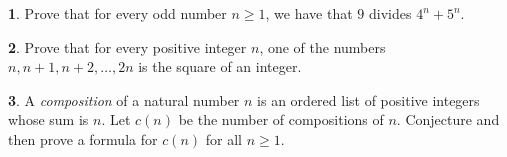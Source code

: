 \documentclass[12pt]{article}
\theoremstyle{definition}
\newtheorem{problem}{}
\begin{document}
\begin{problem}
Prove that for every odd number $n\geq 1$, we have that $9$ divides $4^n+5^n$.
\end{problem}


\begin{problem}
Prove that for every positive integer $n$, one of the numbers $n, n+1, n+2, \ldots , 2n$ is the square of an integer.
\end{problem}

\begin{problem}
A \emph{composition} of a natural number $n$ is an ordered list of positive integers whose sum is $n$. Let $c(n)$ be the number of compositions of $n$. Conjecture and then prove a formula for $c(n)$ for all $n\geq 1$.
\end{problem}
\end{document}
